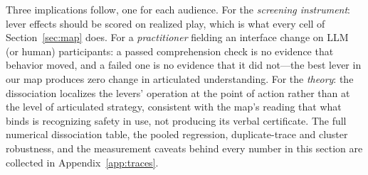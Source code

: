 Three implications follow, one for each audience. For the \emph{screening instrument}: lever effects should be scored on realized play, which is what every cell of Section~\ref{sec:map} does. For a \emph{practitioner} fielding an interface change on LLM (or human) participants: a passed comprehension check is no evidence that behavior moved, and a failed one is no evidence that it did not---the best lever in our map produces zero change in articulated understanding. For the \emph{theory}: the dissociation localizes the levers' operation at the point of action rather than at the level of articulated strategy, consistent with the map's reading that what binds is recognizing safety in use, not producing its verbal certificate. The full numerical dissociation table, the pooled regression, duplicate-trace and cluster robustness, and the measurement caveats behind every number in this section are collected in Appendix~\ref{app:traces}.
